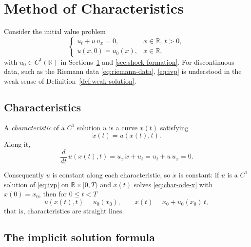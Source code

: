 
\section{Method of Characteristics}
\label{sec:characteristics}

Consider the initial value problem
\begin{equation}
  \label{eq:ivp}
  \begin{cases}
    u_t + u\, u_x = 0, & x \in \mathbb{R},\ t > 0, \\
    u(x,0) = u_0(x), & x \in \mathbb{R},
  \end{cases}
\end{equation}
with $u_0 \in C^1(\mathbb{R})$ in Sections~\ref{sec:characteristics} and
\ref{sec:shock-formation}. For discontinuous data, such as the Riemann data
\eqref{eq:riemann-data}, \eqref{eq:ivp} is understood in the weak sense of
Definition~\ref{def:weak-solution}.

\subsection{Characteristics}
\label{subsec:char-lines}

A \emph{characteristic} of a $C^1$ solution $u$ is a curve $x(t)$ satisfying
\begin{equation}
  \label{eq:char-ode-x}
  \dot{x}(t) = u(x(t), t).
\end{equation}
Along it,
\begin{equation}
  \label{eq:char-ode-u}
  \frac{d}{dt}\, u(x(t), t) = u_x\,\dot{x} + u_t = u_t + u\,u_x = 0 .
\end{equation}

Consequently $u$ is constant along each characteristic, so $\dot x$ is constant:
if $u$ is a $C^1$ solution of \eqref{eq:ivp} on $\mathbb{R}\times[0,T)$ and $x(t)$
solves \eqref{eq:char-ode-x} with $x(0)=x_0$, then for $0\le t<T$
\begin{equation}
  \label{eq:char-formula}
  u(x(t), t) = u_0(x_0), \qquad x(t) = x_0 + u_0(x_0)\, t,
\end{equation}
that is, characteristics are straight lines.

\subsection{The implicit solution formula}
\label{subsec:char-implicit-formula}


